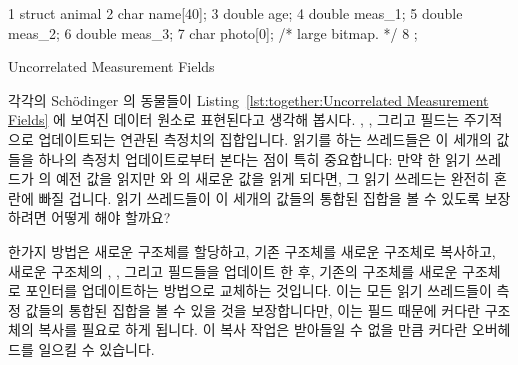 \begin{listing}[tbp]
{ \scriptsize
\begin{verbbox}
 1 struct animal {
 2   char name[40];
 3   double age;
 4   double meas_1;
 5   double meas_2;
 6   double meas_3;
 7   char photo[0]; /* large bitmap. */
 8 };
\end{verbbox}
}
\centering
\theverbbox
\caption{Uncorrelated Measurement Fields}
\label{lst:together:Uncorrelated Measurement Fields}
\end{listing}

각각의 Sch\"odinger 의 동물들이
Listing~\ref{lst:together:Uncorrelated Measurement Fields}
에 보여진 데이터 원소로 표현된다고 생각해 봅시다.
, , 그리고  필드는 주기적으로 업데이트되는
연관된 측정치의 집합입니다.
읽기를 하는 쓰레드들은 이 세개의 값들을 하나의 측정치 업데이트로부터 본다는
점이 특히 중요합니다: 만약 한 읽기 쓰레드가  의 예전 값을 읽지만
 와  의 새로운 값을 읽게 되다면, 그 읽기 쓰레드는 완전히
혼란에 빠질 겁니다.
읽기 쓰레드들이 이 세개의 값들의 통합된 집합을 볼 수 있도록 보장하려면 어떻게
해야 할까요?
\iffalse

Suppose that each of Sch\"odinger's animals is represented by the
data element shown in
Listing~\ref{lst:together:Uncorrelated Measurement Fields}.
The \co{meas_1}, \co{meas_2}, and \co{meas_3} fields are a set
of correlated measurements that are updated periodically.
It is critically important that readers see these three values from
a single measurement update: If a reader sees an old value of
\co{meas_1} but new values of \co{meas_2} and \co{meas_3}, that
reader will become fatally confused.
How can we guarantee that readers will see coordinated sets of these
three values?
\fi

한가지 방법은 새로운  구조체를 할당하고, 기존 구조체를 새로운
구조체로 복사하고, 새로운 구조체의 , , 그리고 
필드들을 업데이트 한 후, 기존의 구조체를 새로운 구조체로 포인터를 업데이트하는
방법으로 교체하는 것입니다.
이는 모든 읽기 쓰레드들이 측정 값들의 통합된 집합을 볼 수 있을 것을
보장합니다만, 이는  필드 때문에 커다란 구조체의 복사를 필요로
하게 됩니다.
이 복사 작업은 받아들일 수 없을 만큼 커다란 오버헤드를 일으킬 수 있습니다.
\iffalse

One approach would be to allocate a new \co{animal} structure,
copy the old structure into the new structure, update the new
structure's \co{meas_1}, \co{meas_2}, and \co{meas_3} fields,
and then replace the old structure with a new one by updating
the pointer.
This does guarantee that all readers see coordinated sets of
measurement values, but it requires copying a large structure due
to the \co{->photo[]} field.
This copying might incur unacceptably large overhead.
\fi


